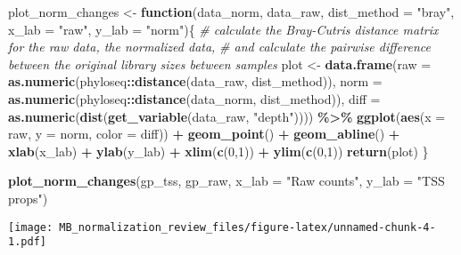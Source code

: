 \documentclass[
]{book}
\newenvironment{Shaded}{\begin{snugshade}}{\end{snugshade}}
\newcommand{\CommentTok}[1]{\textcolor[rgb]{0.56,0.35,0.01}{\textit{#1}}}
\newcommand{\ControlFlowTok}[1]{\textcolor[rgb]{0.13,0.29,0.53}{\textbf{#1}}}
\newcommand{\DataTypeTok}[1]{\textcolor[rgb]{0.13,0.29,0.53}{#1}}
\newcommand{\DecValTok}[1]{\textcolor[rgb]{0.00,0.00,0.81}{#1}}
\newcommand{\KeywordTok}[1]{\textcolor[rgb]{0.13,0.29,0.53}{\textbf{#1}}}
\newcommand{\NormalTok}[1]{#1}
\newcommand{\OperatorTok}[1]{\textcolor[rgb]{0.81,0.36,0.00}{\textbf{#1}}}
\newcommand{\StringTok}[1]{\textcolor[rgb]{0.31,0.60,0.02}{#1}}
\begin{document}
\begin{Shaded}
\begin{Highlighting}[]
\NormalTok{plot\_norm\_changes \textless{}{-}}\StringTok{ }\ControlFlowTok{function}\NormalTok{(data\_norm, data\_raw, }\DataTypeTok{dist\_method =} \StringTok{"bray"}\NormalTok{, }\DataTypeTok{x\_lab =} \StringTok{"raw"}\NormalTok{, }\DataTypeTok{y\_lab =} \StringTok{"norm"}\NormalTok{)\{}
    \CommentTok{\# calculate the Bray{-}Cutris distance matrix for the raw data, the normalized data, }
    \CommentTok{\# and calculate the pairwise difference between the original library sizes between samples}
\NormalTok{    plot \textless{}{-}}\StringTok{ }\KeywordTok{data.frame}\NormalTok{(}\DataTypeTok{raw =} \KeywordTok{as.numeric}\NormalTok{(phyloseq}\OperatorTok{::}\KeywordTok{distance}\NormalTok{(data\_raw, dist\_method)), }
                       \DataTypeTok{norm =} \KeywordTok{as.numeric}\NormalTok{(phyloseq}\OperatorTok{::}\KeywordTok{distance}\NormalTok{(data\_norm, dist\_method)), }
                       \DataTypeTok{diff =} \KeywordTok{as.numeric}\NormalTok{(}\KeywordTok{dist}\NormalTok{(}\KeywordTok{get\_variable}\NormalTok{(data\_raw, }\StringTok{"depth"}\NormalTok{)))) }\OperatorTok{\%\textgreater{}\%}\StringTok{ }
\StringTok{    }\KeywordTok{ggplot}\NormalTok{(}\KeywordTok{aes}\NormalTok{(}\DataTypeTok{x =}\NormalTok{ raw, }\DataTypeTok{y =}\NormalTok{ norm, }\DataTypeTok{color =}\NormalTok{ diff)) }\OperatorTok{+}\StringTok{ }
\StringTok{        }\KeywordTok{geom\_point}\NormalTok{() }\OperatorTok{+}\StringTok{ }
\StringTok{        }\KeywordTok{geom\_abline}\NormalTok{() }\OperatorTok{+}\StringTok{ }
\StringTok{        }\KeywordTok{xlab}\NormalTok{(x\_lab) }\OperatorTok{+}\StringTok{ }\KeywordTok{ylab}\NormalTok{(y\_lab) }\OperatorTok{+}\StringTok{ }\KeywordTok{xlim}\NormalTok{(}\KeywordTok{c}\NormalTok{(}\DecValTok{0}\NormalTok{,}\DecValTok{1}\NormalTok{)) }\OperatorTok{+}\StringTok{ }\KeywordTok{ylim}\NormalTok{(}\KeywordTok{c}\NormalTok{(}\DecValTok{0}\NormalTok{,}\DecValTok{1}\NormalTok{))}
    \KeywordTok{return}\NormalTok{(plot)}
\NormalTok{\}}

\KeywordTok{plot\_norm\_changes}\NormalTok{(gp\_tss, gp\_raw, }\DataTypeTok{x\_lab =} \StringTok{"Raw counts"}\NormalTok{, }\DataTypeTok{y\_lab =} \StringTok{"TSS props"}\NormalTok{)}
\end{Highlighting}
\end{Shaded}

\texttt{[image: MB\_normalization\_review\_files/figure-latex/unnamed-chunk-4-1.pdf]}
\end{document}
